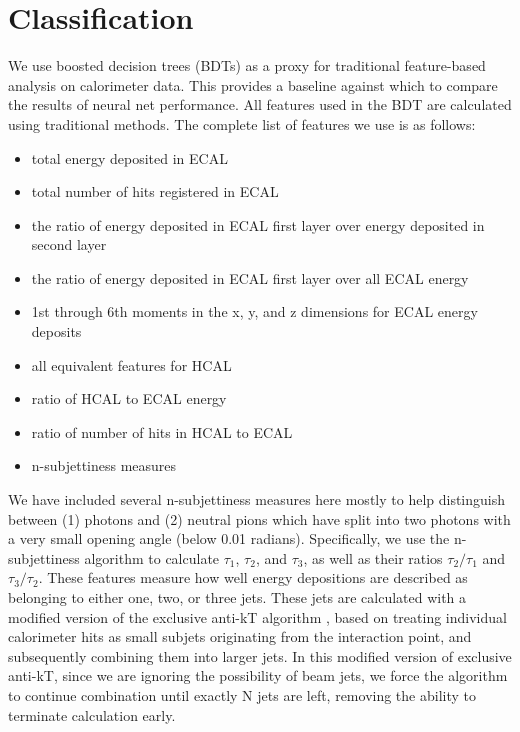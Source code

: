 \documentclass{article}
\begin{document}
    \section*{Classification}

    We use boosted decision trees (BDTs) as a proxy for traditional feature-based analysis on calorimeter data. This provides a baseline against which to compare the results of neural net performance. All features used in the BDT are calculated using traditional methods. The complete list of features we use is as follows:

    \begin{itemize}
        \item total energy deposited in ECAL
        \item total number of hits registered in ECAL
        \item the ratio of energy deposited in ECAL first layer over energy deposited in second layer
        \item the ratio of energy deposited in ECAL first layer over all ECAL energy
        \item 1st through 6th moments in the x, y, and z dimensions for ECAL energy deposits
        \item all equivalent features for HCAL
        \item ratio of HCAL to ECAL energy
        \item ratio of number of hits in HCAL to ECAL
        \item n-subjettiness measures
    \end{itemize}

    We have included several n-subjettiness measures here mostly to help distinguish between (1) photons and (2) neutral pions which have split into two photons with a very small opening angle (below 0.01 radians). Specifically, we use the n-subjettiness algorithm \cite{nsub} to calculate $\tau_1$, $\tau_2$, and $\tau_3$, as well as their ratios $\tau_2/\tau_1$ and $\tau_3/\tau_2$. These features measure how well energy depositions are described as belonging to either one, two, or three jets. These jets are calculated with a modified version of the exclusive anti-kT algorithm \cite{anti-kt}, based on treating individual calorimeter hits as small subjets originating from the interaction point, and subsequently combining them into larger jets. In this modified version of exclusive anti-kT, since we are ignoring the possibility of beam jets, we force the algorithm to continue combination until exactly N jets are left, removing the ability to terminate calculation early.
\end{document}
